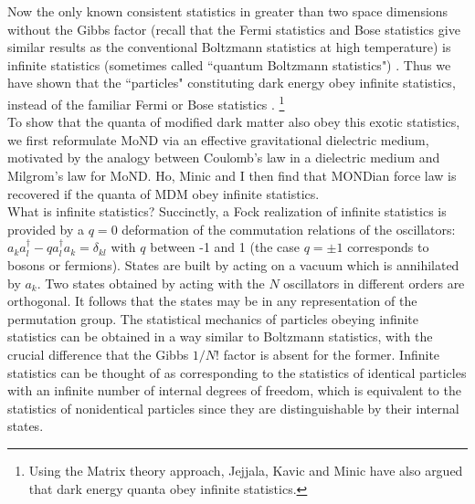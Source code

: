 \documentclass[a4paper]{jpconf}
\begin{document}
Now the only known consistent statistics in greater than two space
dimensions
without the Gibbs factor (recall that the Fermi statistics and Bose
statistics give similar results as
the conventional Boltzmann statistics at high temperature)
is infinite statistics (sometimes called
``quantum Boltzmann statistics") \cite{DHR,govorkov,greenberg}.  Thus we
have
shown that the ``particles" constituting dark energy obey infinite
statistics,
instead of the familiar Fermi or Bose statistics \cite{plb}.
\footnote{
Using the Matrix theory approach,
Jejjala, Kavic and Minic \cite{minic} have also argued that dark energy 
quanta obey infinite statistics.}\\

To show that the quanta of modified dark matter also obey
this exotic statistics, we \cite{PRD}  first reformulate MoND via an effective 
gravitational dielectric medium, motivated by the analogy \cite{dielectric} 
between Coulomb's law in a dielectric medium and Milgrom's law for MoND.
Ho, Minic and I then find that MONDian force law is recovered if the quanta
of MDM obey infinite statistics.\\

What is infinite statistics?  Succinctly, a Fock realization of infinite
statistics is provided by a $q = 0$ deformation of the 
commutation relations of
the oscillators:
$a_k a^{\dagger}_l - q a^{\dagger}_l a_k = \delta_{kl}$ with $q$ between -1
and 1 (the case $q = \pm 1$ corresponds to bosons or fermions).  States are
built by acting on a vacuum which is annihilated by $a_k$.  Two states
obtained by acting with the $N$ oscillators in different orders are
orthogonal.  It follows that the states may be in any representation
of the permutation group.  The statistical mechanics of particles obeying
infinite statistics can be obtained in a way similar to Boltzmann
statistics, with the crucial difference that the Gibbs
$1/N!$ factor is absent for the former.  Infinite statistics can be
thought of as corresponding to the statistics of identical particles with an
infinite number of internal degrees of freedom, which is
equivalent to the statistics of nonidentical particles since they are
distinguishable by their internal states.\\
\end{document}

